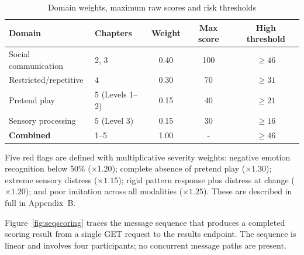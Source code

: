 \documentclass[12pt,a4paper,oneside]{report}
\begin{document}
	\begin{table}[t]
		\caption{Domain weights, maximum raw scores and risk thresholds}
		\label{tab:weights}
		\begin{tabularx}{\linewidth}{lXccc}
			\toprule
			\textbf{Domain} & \textbf{Chapters} & \textbf{Weight} & \textbf{Max score} & \textbf{High threshold} \\
			\midrule
			Social communication     & 2, 3           & 0.40 & 100 & $\geq 46$ \\
			Restricted/repetitive    & 4              & 0.30 & 70  & $\geq 31$ \\
			Pretend play             & 5 (Levels 1--2)& 0.15 & 40  & $\geq 21$ \\
			Sensory processing       & 5 (Level 3)    & 0.15 & 30  & $\geq 16$ \\
			\midrule
			\textbf{Combined}        & 1--5           & 1.00 & - & $\geq 46$ \\
			\bottomrule
		\end{tabularx}
	\end{table}
	
	Five red flags are defined with multiplicative severity weights: negative emotion recognition below 50\% ($\times1.20$); complete absence of pretend play ($\times1.30$); extreme sensory distress ($\times1.15$); rigid pattern response plus distress at change ($\times1.20$); and poor imitation across all modalities ($\times1.25$). These are described in full in Appendix~B.
	
	Figure~\ref{fig:seqscoring} traces the message sequence that produces a completed scoring result from a single GET request to the results endpoint. The sequence is linear and involves four participants; no concurrent message paths are present.
	
\end{document}
